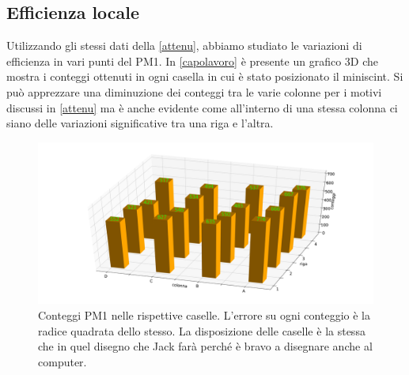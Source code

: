 \subsection{Efficienza locale}
\label{localis}
Utilizzando gli stessi dati della \autoref{attenu}, abbiamo studiato le variazioni di efficienza in vari punti del PM1. In \autoref{capolavoro} è presente un grafico 3D che mostra i conteggi ottenuti in ogni casella in cui è stato posizionato il miniscint. Si può apprezzare una diminuzione dei conteggi tra le varie colonne per i motivi discussi in \autoref{attenu} ma è anche evidente come all'interno di una stessa colonna ci siano delle variazioni significative tra una riga e l'altra.
\begin{figure}[h]
\flushleft
\includegraphics[width=17 cm]{3d_rit}
\caption{Conteggi PM1 nelle rispettive caselle. L'errore su ogni conteggio è la radice quadrata dello stesso. La disposizione delle caselle è la stessa che in quel disegno che Jack farà perché è bravo a disegnare anche al computer.}
\label{capolavoro}
\end{figure}

